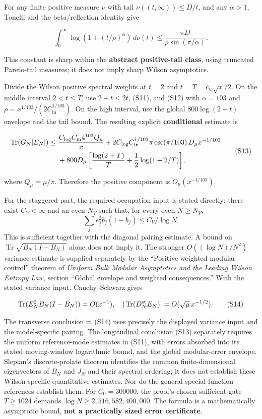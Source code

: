\documentclass[
  10pt,
  a4paper,
]{article}
\begin{document}
For any finite positive measure \(\nu\) with tail \(\nu((t,\infty))\le D/t\), and any \(\alpha>1\), Tonelli and the beta/reflection identity give

\[
\boxed{\int_0^\infty\log(1+(t/\rho)^\alpha)\,d\nu(t)
 \le\frac{\pi D}{\rho\sin(\pi/\alpha)}.}
\tag{S12}
\]

This constant is sharp within the \textbf{abstract positive-tail class}, using truncated Pareto-tail measures; it does not imply sharp Wilson asymptotics.

Divide the Wilson positive spectral weights at \(t=2\) and \(t=T=c_w \sqrt{x}/2\). On the middle interval \(2<t\le T\), use \(2+t\le 2t\), (S11), and (S12) with \(\alpha=103\) and \(\rho=x^{1/103}/(2 C_{\mathrm{in}}^{1/103})\). On the high interval, use the global \(800 \log(2+t)\) envelope and the tail bound. The resulting explicit \textbf{conditional} estimate is

\[
\begin{split}
 \operatorname{Tr}(G_N|E_N|)\le{}&
  \frac{C_{\log}C_{\rm in}4^{103}Q_\mu}{x}
 +2C_{\log} C_{\rm in}^{1/103}\pi\csc(\pi/103)\,
 D_\mu x^{-1/103}\\
 &+800D_\mu\left[
  \frac{\log(2+T)}{T}+\frac12\log(1+2/T)\right],
\end{split}
\tag{S13}
\]

where \(Q_\mu=\mu/\pi\). Therefore the positive component is \(O_\mu(x^{-1/103})\).

For the staggered part, the required occupation input is stated directly: there exist \(C_V<\infty\) and an even \(N_V\) such that, for every even \(N\ge N_V\), \[
\sum_j e_j^2b_j(1-b_j)\le C_V/\log N.
\] This is sufficient together with the diagonal pairing estimate. A bound on \(\operatorname{Tr}\sqrt{B_N(I-B_N)}\) alone does not imply it. The stronger \(O((\log N)/N^2)\) variance estimate is supplied separately by the ``Positive weighted modular control'' theorem of \emph{Uniform Bulk Modular Asymptotics and the Leading Wilson Entropy Law}, section ``Global envelope and weighted consequences.'' With the stated variance input, Cauchy--Schwarz gives

\[
 \operatorname{Tr}(E_N^2 B_N(I-B_N))=O(x^{-1}),
\quad |\operatorname{Tr}(D_N^{\rm st}E_N)|=O(\sqrt\mu\,x^{-1/2}).
\tag{S14}
\]

The transverse conclusion in (S14) uses precisely the displayed variance input and the model-specific pairing. The longitudinal conclusion (S13) separately requires the uniform reference-mode estimates in (S11), with errors absorbed into its stated moving-window logarithmic bound, and the global modular-error envelope. Slepian's discrete-prolate theorem identifies the common finite-dimensional eigenvectors of \(B_N\) and \(J_N\) and their spectral ordering; it does not establish these Wilson-specific quantitative estimates. Nor do the general special-function references establish them. For \(C_0=300000\), the proof's chosen sufficient gate \(T\ge 1024\) demands \(\log N \ge  2,516,582,400,000\). The formula is a mathematically asymptotic bound, \textbf{not a practically sized error certificate}.
\end{document}
